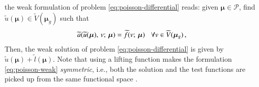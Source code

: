 \documentclass{elsarticle}
\numberwithin{equation}{section}
\theoremstyle{theorem}
\theoremstyle{definition}
\theoremstyle{remark}
\theoremstyle{proposition}
\numberwithin{figure}{section}
\newcommand{\wt}[1]{\widetilde{#1}}
\newcommand{\bg}[1]{\boldsymbol{#1}}
\begin{document}
		the weak formulation of problem \eqref{eq:poisson-differential} reads: given $\bg{\mu} \in \mathcal{P}$, find $\wt{u}(\bg{\mu}) \in \wt{V}(\bg{\mu}_g)$ such that
		\begin{equation}
			\label{eq:poisson-weak}
			\wt{a}(\wt{u}(\bg{\mu}), \, v; \, \bg{\mu}) = \wt{f}(v; \, \bg{\mu}) \hspace*{0.3cm} \forall v \in \wt{V}(\bg{\mu}_g) \, , 
		\end{equation}
		Then, the weak solution of problem \eqref{eq:poisson-differential} is given by $\wt{u}(\bg{\mu}) + \wt{l}(\bg{\mu})$. Note that using a lifting function makes the formulation \eqref{eq:poisson-weak} \emph{symmetric}, i.e., both the solution and the test functions are picked up from the same functional space \cite{Qua10}.
		
		
\end{document}

